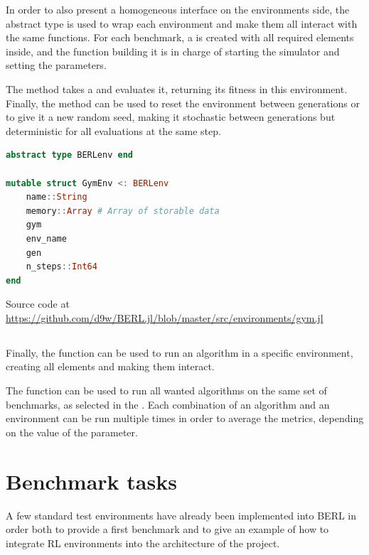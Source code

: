 In order to also present a homogeneous interface on the environments side, the  abstract type is used to wrap each environment and make them all interact with the same functions. For each benchmark, a  is created with all required elements inside, and the function building it is in charge of starting the simulator and setting the parameters.

The  method takes a  and evaluates it, returning its fitness in this environment. Finally, the  method can be used to reset the environment between generations or to give it a new random seed, making it stochastic between generations but deterministic for all evaluations at the same step.

\begin{minipage}{\linewidth}
\begin{lstlisting}[language=Julia, caption=Gym wrapper in BERL]
abstract type BERLenv end

mutable struct GymEnv <: BERLenv
    name::String
    memory::Array # Array of storable data
    gym
    env_name
    gen
    n_steps::Int64
end
\end{lstlisting}
Source code at \url{https://github.com/d9w/BERL.jl/blob/master/src/environments/gym.jl}\\
\end{minipage}


\subsection{}

Finally, the  function can be used to run an algorithm in a specific environment, creating all elements and making them interact. 

The  function can be used to run all wanted algorithms on the same set of benchmarks, as selected in the . Each combination of an algorithm and an environment can be run multiple times in order to average the metrics, depending on the value of the  parameter.

\section{Benchmark tasks}
A few standard test environments have already been implemented into BERL in order both to provide a first benchmark and to give an example of how to integrate RL environments into the architecture of the project. 

